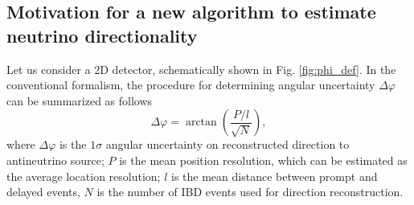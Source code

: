 \documentclass[tightenlines,
twocolumn,prl,notitlepage,nofootinbib,preprintnumbers,longbibliography]{revtex4-1}
\begin{document}
\subsection{Motivation for a new algorithm to estimate neutrino directionality}

Let us consider a 2D detector, schematically shown in Fig. \ref{fig:phi_def}.
In the conventional formalism, the procedure for determining angular uncertainty $\Delta\varphi$ can be summarized as follows \cite{Duvall_2022}
\begin{equation}
      \Delta \varphi = \arctan \left( \frac{P/l}{\sqrt N} \right),
      \label{eq:deltaphi}
\end{equation}
where $\Delta\varphi$ is the $1\sigma$ angular uncertainty on reconstructed direction to antineutrino source;
$P$ is the mean position resolution, which can be estimated as the average location resolution;
$l$ is the mean distance between prompt and delayed events, 
$N$ is the number of IBD events used for direction reconstruction.
\end{document}
